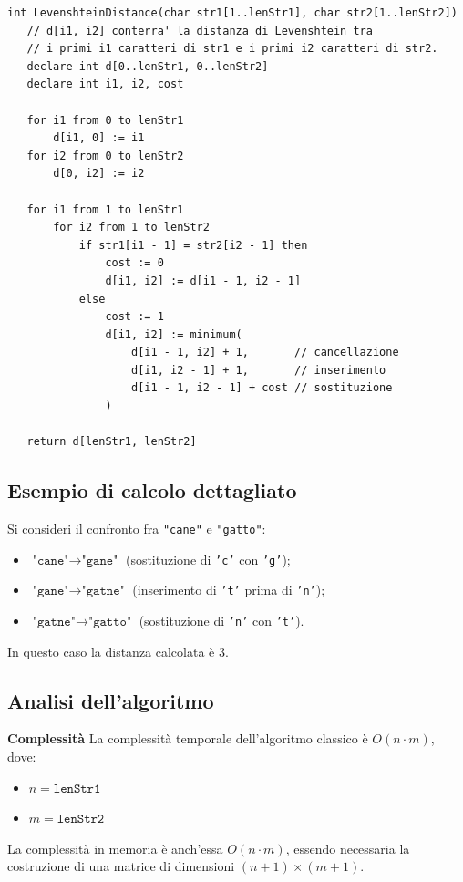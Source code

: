\documentclass[14pt]{extbook}
\begin{document}
\begin{lstlisting}[caption=Pseudocodice dell'algoritmo di Levenshtein, label=lst:levenshtein]
int LevenshteinDistance(char str1[1..lenStr1], char str2[1..lenStr2])
   // d[i1, i2] conterra' la distanza di Levenshtein tra
   // i primi i1 caratteri di str1 e i primi i2 caratteri di str2.
   declare int d[0..lenStr1, 0..lenStr2]
   declare int i1, i2, cost

   for i1 from 0 to lenStr1
       d[i1, 0] := i1
   for i2 from 0 to lenStr2
       d[0, i2] := i2

   for i1 from 1 to lenStr1
       for i2 from 1 to lenStr2
           if str1[i1 - 1] = str2[i2 - 1] then
               cost := 0
               d[i1, i2] := d[i1 - 1, i2 - 1]
           else
               cost := 1
               d[i1, i2] := minimum(
                   d[i1 - 1, i2] + 1,       // cancellazione
                   d[i1, i2 - 1] + 1,       // inserimento
                   d[i1 - 1, i2 - 1] + cost // sostituzione
               )

   return d[lenStr1, lenStr2]
\end{lstlisting}

\subsection{Esempio di calcolo dettagliato}
Si consideri il confronto fra \texttt{"cane"} e \texttt{"gatto"}:

\begin{itemize}
  \item $\texttt{"cane"} \rightarrow \texttt{"gane"}$ (sostituzione di \texttt{'c'} con \texttt{'g'});
  \item $\texttt{"gane"} \rightarrow \texttt{"gatne"}$ (inserimento di \texttt{'t'} prima di \texttt{'n'});
  \item $\texttt{"gatne"} \rightarrow \texttt{"gatto"}$ (sostituzione di \texttt{'n'} con \texttt{'t'}).
\end{itemize}
In questo caso la distanza calcolata è $3$. 

\subsection{Analisi dell'algoritmo}
\textbf{Complessità}
La complessità temporale dell'algoritmo classico è $O(n \cdot m)$, dove:
\begin{itemize}
  \item $n = \texttt{lenStr1}$
  \item $m = \texttt{lenStr2}$
\end{itemize}
La complessità in memoria è anch'essa $O(n \cdot m)$, essendo necessaria la 
costruzione di una matrice di dimensioni $(n+1) \times (m+1)$.
\end{document}
